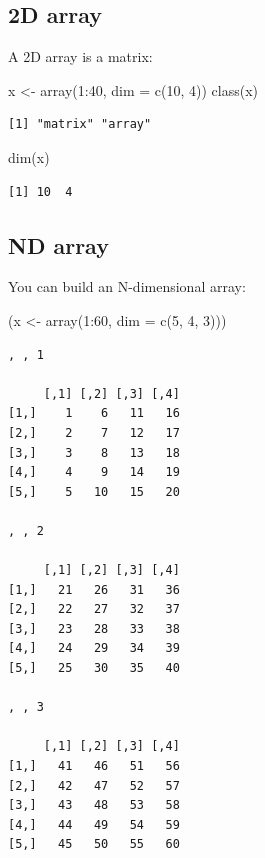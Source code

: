 \documentclass[
]{book}
\newenvironment{Shaded}{\begin{snugshade}}{\end{snugshade}}
\newcommand{\AttributeTok}[1]{\textcolor[rgb]{0.77,0.63,0.00}{#1}}
\newcommand{\DecValTok}[1]{\textcolor[rgb]{0.00,0.00,0.81}{#1}}
\newcommand{\FunctionTok}[1]{\textcolor[rgb]{0.00,0.00,0.00}{#1}}
\newcommand{\NormalTok}[1]{#1}
\newcommand{\OtherTok}[1]{\textcolor[rgb]{0.56,0.35,0.01}{#1}}
\newcommand{\SpecialCharTok}[1]{\textcolor[rgb]{0.00,0.00,0.00}{#1}}
\begin{document}
\hypertarget{d-array-1}{%
\subsection{2D array}\label{d-array-1}}

A 2D array is a matrix:

\begin{Shaded}
\begin{Highlighting}[]
\NormalTok{x }\OtherTok{\textless{}{-}} \FunctionTok{array}\NormalTok{(}\DecValTok{1}\SpecialCharTok{:}\DecValTok{40}\NormalTok{, }\AttributeTok{dim =} \FunctionTok{c}\NormalTok{(}\DecValTok{10}\NormalTok{, }\DecValTok{4}\NormalTok{))}
\FunctionTok{class}\NormalTok{(x)}
\end{Highlighting}
\end{Shaded}

\begin{verbatim}
[1] "matrix" "array" 
\end{verbatim}

\begin{Shaded}
\begin{Highlighting}[]
\FunctionTok{dim}\NormalTok{(x)}
\end{Highlighting}
\end{Shaded}

\begin{verbatim}
[1] 10  4
\end{verbatim}

\hypertarget{nd-array}{%
\subsection{ND array}\label{nd-array}}

You can build an N-dimensional array:

\begin{Shaded}
\begin{Highlighting}[]
\NormalTok{(x }\OtherTok{\textless{}{-}} \FunctionTok{array}\NormalTok{(}\DecValTok{1}\SpecialCharTok{:}\DecValTok{60}\NormalTok{, }\AttributeTok{dim =} \FunctionTok{c}\NormalTok{(}\DecValTok{5}\NormalTok{, }\DecValTok{4}\NormalTok{, }\DecValTok{3}\NormalTok{)))}
\end{Highlighting}
\end{Shaded}

\begin{verbatim}
, , 1

     [,1] [,2] [,3] [,4]
[1,]    1    6   11   16
[2,]    2    7   12   17
[3,]    3    8   13   18
[4,]    4    9   14   19
[5,]    5   10   15   20

, , 2

     [,1] [,2] [,3] [,4]
[1,]   21   26   31   36
[2,]   22   27   32   37
[3,]   23   28   33   38
[4,]   24   29   34   39
[5,]   25   30   35   40

, , 3

     [,1] [,2] [,3] [,4]
[1,]   41   46   51   56
[2,]   42   47   52   57
[3,]   43   48   53   58
[4,]   44   49   54   59
[5,]   45   50   55   60
\end{verbatim}
\end{document}

